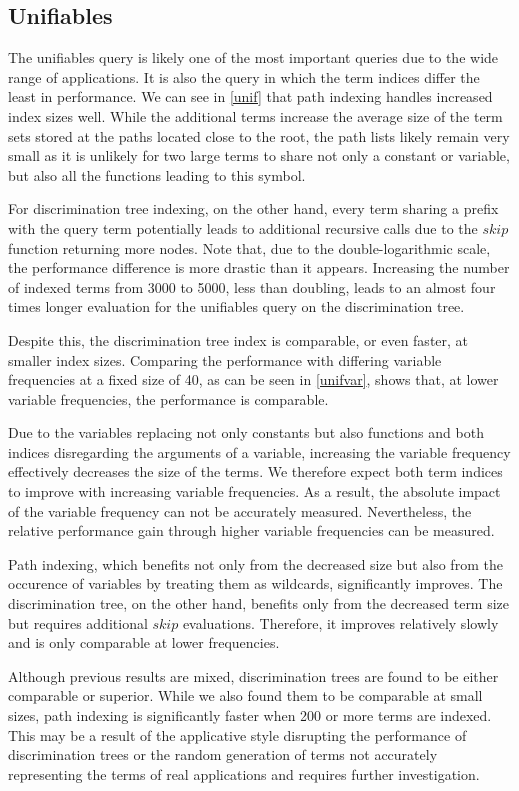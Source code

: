 \subsection{Unifiables} \label{unif_eval}
The unifiables query is likely one of the most important queries due to the wide range of applications. It is also the query in which the term indices differ the least in performance. We can see in \cref{unif} that path indexing handles increased index sizes well. While the additional terms increase the average size of the term sets stored at the paths located close to the root, the path lists likely remain very small as it is unlikely for two large terms to share not only a constant or variable, but also all the functions leading to this symbol.

For discrimination tree indexing, on the other hand, every term sharing a prefix with the query term potentially leads to additional recursive calls due to the $skip$ function returning more nodes. Note that, due to the double-logarithmic scale, the performance difference is more drastic than it appears. Increasing the number of indexed terms from 3000 to 5000, less than doubling, leads to an almost four times longer evaluation for the unifiables query on the discrimination tree.

Despite this, the discrimination tree index is comparable, or even faster, at smaller index sizes. Comparing the performance with differing variable frequencies at a fixed size of 40, as can be seen in \cref{unifvar}, shows that, at lower variable frequencies, the performance is comparable.

Due to the variables replacing not only constants but also functions and both indices disregarding the arguments of a variable, increasing the variable frequency effectively decreases the size of the terms. We therefore expect both term indices to improve with increasing variable frequencies. As a result, the absolute impact of the variable frequency can not be accurately measured. Nevertheless, the relative performance gain through higher variable frequencies can be measured.

Path indexing, which benefits not only from the decreased size but also from the occurence of variables by treating them as wildcards, significantly improves. The discrimination tree, on the other hand, benefits only from the decreased term size but requires additional $skip$ evaluations. Therefore, it improves relatively slowly and is only comparable at lower frequencies.

 Although previous results are mixed, discrimination trees are found to be either comparable or superior. While we also found them to be comparable at small sizes, path indexing is significantly faster when 200 or more terms are indexed. This may be a result of the applicative style disrupting the performance of discrimination trees or the random generation of terms not accurately representing the terms of real applications and requires further investigation.

